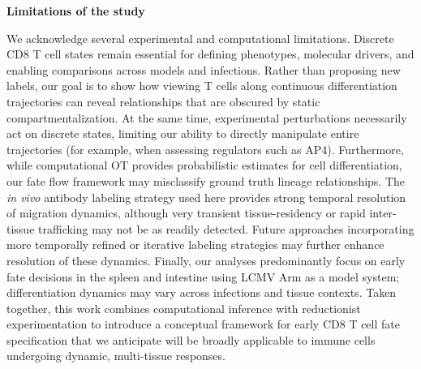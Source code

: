 \textbf{Limitations of the study}

We acknowledge several experimental and computational limitations. Discrete CD8 T cell states remain essential for defining phenotypes, molecular drivers, and enabling comparisons across models and infections. Rather than proposing new labels, our goal is to show how viewing T cells along continuous differentiation trajectories can reveal relationships that are obscured by static compartmentalization. At the same time, experimental perturbations necessarily act on discrete states, limiting our ability to directly manipulate entire trajectories (for example, when assessing regulators such as AP4). Furthermore, while computational OT provides probabilistic estimates for cell differentiation, our fate flow framework may misclassify ground truth lineage relationships. The \emph{in vivo} antibody labeling strategy used here provides strong temporal resolution of migration dynamics, although very transient tissue-residency or rapid inter-tissue trafficking may not be as readily detected. Future approaches incorporating more temporally refined or iterative labeling strategies may further enhance resolution of these dynamics. Finally, our analyses predominantly focus on early fate decisions in the spleen and intestine using LCMV Arm as a model system; differentiation dynamics may vary across infections and tissue contexts. Taken together, this work combines computational inference with reductionist experimentation to introduce a conceptual framework for early CD8 T cell fate specification that we anticipate will be broadly applicable to immune cells undergoing dynamic, multi-tissue responses.

